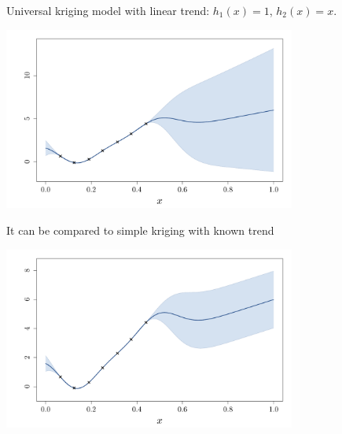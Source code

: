 \documentclass{beamer}
\begin{document}
\begin{frame}{}
Universal kriging model with linear trend: $h_1(x) = 1$, $h_2(x) = x$.
\begin{center}
	\includegraphics[height=6cm]{figures/R/trend_ku}
\end{center}
\end{frame}

\begin{frame}{}
It can be compared to simple kriging with known trend
\begin{center}
	\includegraphics[height=6cm]{figures/R/trend_kstrend}
\end{center}
\end{frame}


\end{document}
